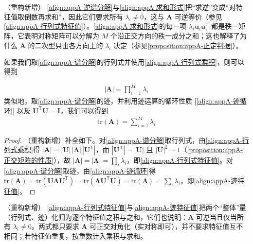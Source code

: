 \documentclass[../main.tex]{subfiles}
\begin{document}
\begin{remark}（重构新增）
\eqref{align:appA-逆谱分解}与\eqref{align:appA-求和形式}把“求逆”变成“对特征值取倒数再求和”，因此它们要求所有 $\lambda_i\neq0$，这与 $\bm{A}$ 可逆等价（参见\eqref{align:appA-行列式特征值}）。\eqref{align:appA-求和形式}的每一项 $\lambda_i\bm{u}_i\bm{u}_i^{\mathsf{T}}$ 都是秩一矩阵，它表明对称矩阵可以分解为 $M$ 个沿正交方向的秩一成分之和；这也解释了为什么 $\bm{A}$ 的二次型只由各方向上的 $\lambda_i$ 决定（参见\cref{proposition:appA-正定判据}）。
\end{remark}

如果我们取\eqref{align:appA-谱分解}的行列式并使用\eqref{align:appA-行列式乘积}，则可以得到
\begin{proposition}[行列式与迹的特征值表示]\label{proposition:appA-行列式与迹}
\begin{align}
  |\bm{A}|=\prod_{i=1}^{M}\lambda_i
  \label{align:appA-行列式特征值}
\end{align}
类似地，取\eqref{align:appA-谱分解}的迹，并利用迹运算的循环性质 [\eqref{align:appA-迹循环}] 以及 $\bm{U}^{\mathsf{T}}\bm{U}=\bm{I}$，我们可以得到
\begin{align}
  \mathrm{tr}(\bm{A})=\sum_{i=1}^{M}\lambda_i
  \label{align:appA-迹特征值}
\end{align}
\end{proposition}

\begin{proof}
（重构新增）补全如下。对\eqref{align:appA-谱分解}取行列式，由\eqref{align:appA-行列式乘积}得 $|\bm{A}|=|\bm{U}|\,|\bm{\Lambda}|\,|\bm{U}^{\mathsf{T}}|$，而 $|\bm{U}^{\mathsf{T}}|=|\bm{U}|$ 且 $|\bm{U}|^{2}=1$（\cref{proposition:appA-正交矩阵的性质}），故 $|\bm{A}|=|\bm{\Lambda}|=\prod_i\lambda_i$，即\eqref{align:appA-行列式特征值}。对\eqref{align:appA-谱分解}取迹，由\eqref{align:appA-迹循环}得 $\mathrm{tr}(\bm{A})=\mathrm{tr}(\bm{U}\bm{\Lambda}\bm{U}^{\mathsf{T}})=\mathrm{tr}(\bm{\Lambda}\bm{U}^{\mathsf{T}}\bm{U})=\mathrm{tr}(\bm{\Lambda})=\sum_i\lambda_i$，即\eqref{align:appA-迹特征值}。
\end{proof}

\begin{remark}（重构新增）
\eqref{align:appA-行列式特征值}与\eqref{align:appA-迹特征值}把两个“整体”量（行列式、迹）化归为逐个特征值之积与之和，它们也说明：$\bm{A}$ 可逆当且仅当所有 $\lambda_i\neq0$。两式都只要求 $\bm{A}$ 可正交对角化（实对称即可），并不要求特征值互不相同；若特征值重复，按重数计入乘积与求和。
\end{remark}
\end{document}
